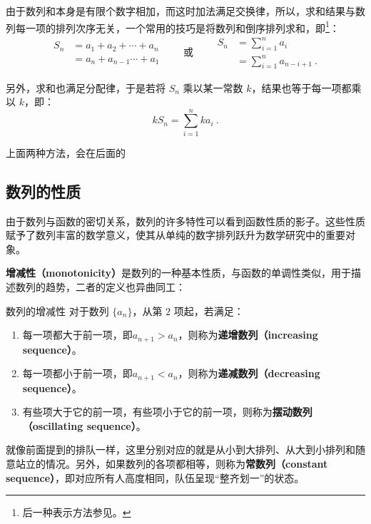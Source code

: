 由于数列和本身是有限个数字相加，而这时加法满足交换律，所以，求和结果与数列每一项的排列次序无关，一个常用的技巧是将数列和倒序排列求和，即\footnote{后一种表示方法参见。}：
\begin{equation}\label{eq_HsSeFu_1}
\begin{split}
S_n&=a_1 + a_2 + \cdots + a_n\\
&=a_n+a_{n-1} \cdots +a_1
\end{split}
\qquad\text{或}\qquad
\begin{split}
S_n&=\sum_{i=1}^n a_i\\
&=\sum_{i=1}^n a_{n-i+1}~.
\end{split}
\end{equation}

另外，求和也满足分配律，于是若将 $S_n$ 乘以某一常数 $k$，结果也等于每一项都乘以 $k$，即：
\begin{equation}
kS_n=\sum_{i=1}^n ka_i~.
\end{equation}

上面两种方法，会在后面的
\subsection{数列的性质}

由于数列与函数的密切关系，数列的许多特性可以看到函数性质的影子。这些性质赋予了数列丰富的数学意义，使其从单纯的数字排列跃升为数学研究中的重要对象。

\textbf{增减性（monotonicity）}是数列的一种基本性质，与函数的单调性类似，用于描述数列的趋势，二者的定义也异曲同工：

\begin{definition}{数列的增减性}
对于数列 $\{a_n\}$，从第 $2$ 项起，若满足：
\begin{enumerate}
\item 每一项都大于前一项，即$a_{n+1} > a_n$，则称为\textbf{递增数列（increasing sequence）}。
\item 每一项都小于前一项，即$a_{n+1} < a_n$，则称为\textbf{递减数列（decreasing sequence）}。
\item 有些项大于它的前一项，有些项小于它的前一项，则称为\textbf{摆动数列（oscillating sequence）}。
\end{enumerate}
\end{definition}

就像前面提到的排队一样，这里分别对应的就是从小到大排列、从大到小排列和随意站立的情况。另外，如果数列的各项都相等，则称为\textbf{常数列（constant sequence）}，即对应所有人高度相同，队伍呈现“整齐划一”的状态。

